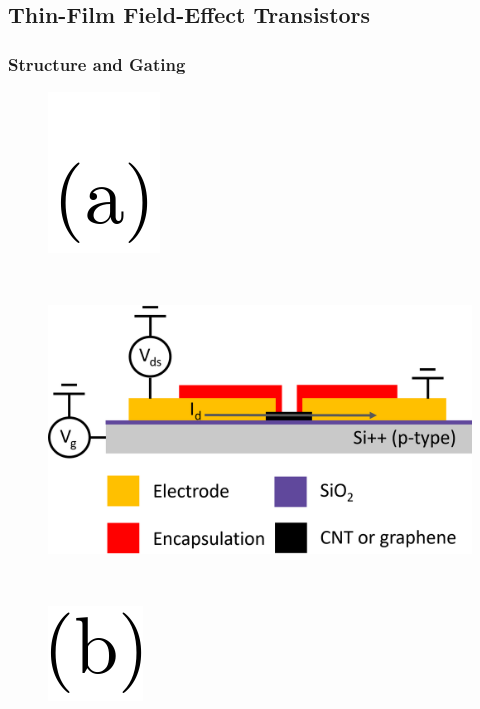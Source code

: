 \documentclass[
  letterpaper,
  DIV=11,
  numbers=noendperiod]{scrartcl}
\begin{document}
\subsection{Thin-Film Field-Effect Transistors}\label{sec-general-FETs}

\subsubsection{Structure and Gating}\label{sec-gating}

\begin{figure}

\begin{minipage}{0.03\linewidth}
\includegraphics{figures/(a).png}\end{minipage}%
%
\begin{minipage}{0.01\linewidth}
~\end{minipage}%
%
\begin{minipage}{0.45\linewidth}
\includegraphics{figures/ch2/back-gate-schematic.png}\end{minipage}%
%
\begin{minipage}{0.01\linewidth}
~\end{minipage}%
%
\begin{minipage}{0.03\linewidth}
\includegraphics{figures/(b).png}\end{minipage}%

\end{figure}
\end{document}
